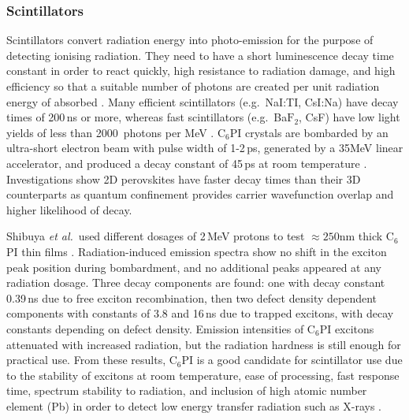 \subsubsection{Scintillators}
Scintillators convert radiation energy into photo-emission for the purpose of detecting ionising radiation. They need to have a short luminescence decay time constant in order to react quickly, high resistance to radiation damage, and high efficiency so that a suitable number of photons are created per unit radiation energy of absorbed \cite{Shibuya2002}. Many efficient scintillators (e.g.\ NaI:TI, CsI:Na) have decay times of 200\,ns or more, whereas fast scintillators (e.g.\ Ba$\textrm{F}_2$, CsF) have low light yields of less than 2000~photons per MeV \cite{Kengo2002}. $\textrm{C}_6$PI crystals are bombarded by an ultra-short electron beam with pulse width of 1-2\,ps, generated by a 35MeV linear accelerator, and produced a decay constant of 45\,ps at room temperature \cite{Kengo2002}. Investigations show 2D perovskites have faster decay times than their 3D counterparts as quantum confinement provides carrier wavefunction overlap and higher likelihood of decay.

Shibuya \textit{et al.}\ used different dosages of 2\,MeV protons to test $\approx250$nm thick $\textrm{C}_6$PI thin films \cite{Shibuya2002}. Radiation-induced emission spectra show no shift in the exciton peak position during bombardment, and no additional peaks appeared at any radiation dosage. Three decay components are found: one with decay constant 0.39\,ns due to free exciton recombination, then two defect density dependent components with constants of 3.8 and 16\,ns due to trapped excitons, with decay constants depending on defect density. Emission intensities of $\textrm{C}_6$PI excitons attenuated with increased radiation, but the radiation hardness is still enough for practical use. From these results, $\textrm{C}_6$PI is a good candidate for scintillator use due to the stability of excitons at room temperature, ease of processing, fast response time, spectrum stability to radiation, and inclusion of high atomic number element (Pb) in order to detect low energy transfer radiation such as X-rays \cite{Shibuya2004}. 

